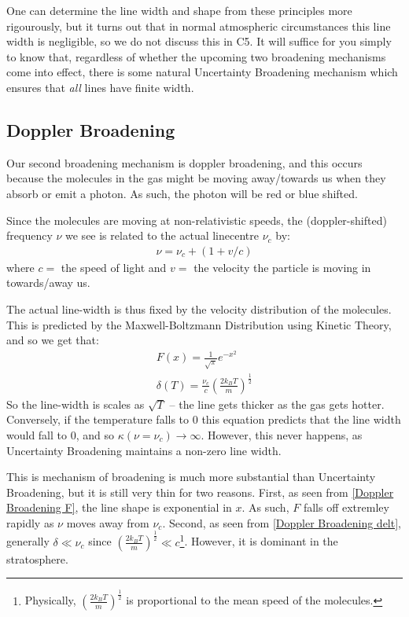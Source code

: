 One can determine the line width and shape from these principles more rigourously, but it turns out that in normal atmospheric circumstances this line width is negligible, so we do not discuss this in C5. It will suffice for you simply to know that, regardless of whether the upcoming two broadening mechanisms come into effect, there is some natural Uncertainty Broadening mechanism which ensures that \textit{all} lines have finite width.

\subsection{Doppler Broadening}

Our second broadening mechanism is doppler broadening, and this occurs because the molecules in the gas might be moving away/towards us when they absorb or emit a photon. As such, the photon will be red or blue shifted.

Since the molecules are moving at non-relativistic speeds, the (doppler-shifted) frequency $\nu$ we see is related to the actual linecentre $\nu_c$ by:
\begin{align*}
    \nu=\nu_c+(1+v/c)
\end{align*}
where $c=$ the speed of light and $v=$ the velocity the particle is moving in towards/away us.

The actual line-width is thus fixed by the velocity distribution of the molecules. This is predicted by the Maxwell-Boltzmann Distribution using Kinetic Theory, and so we get that:
\begin{gather}
    \label{Doppler Broadening F}
    \boxed{
        F(x)=\frac{1}{\sqrt{\pi}}e^{-x^2}
    }\\
    \label{Doppler Broadening delt}
    \boxed{
        \delta(T) = \frac{\nu_c}{c}\left( \frac{2k_BT}{m} \right)^{\frac{1}{2}}
    }
\end{gather}
So the line-width is scales as $\sqrt{T}$ – the line gets thicker as the gas gets hotter. Conversely, if the temperature falls to $0$ this equation predicts that the line width would fall to $0$, and so $\kappa(\nu=\nu_c)\to\infty$. However, this never happens, as Uncertainty Broadening maintains a non-zero line width.

This is mechanism of broadening is much more substantial than Uncertainty Broadening, but it is still very thin for two reasons. First, as seen from \ref{Doppler Broadening F}, the line shape is exponential in $x$. As such, $F$ falls off extremley rapidly as $\nu$ moves away from $\nu_c$. Second, as seen from \ref{Doppler Broadening delt}, generally $\delta\ll\nu_c$ since $\left( \frac{2k_BT}{m} \right)^{\frac{1}{2}}\ll c$\footnote{Physically, $\left( \frac{2k_BT}{m} \right)^{\frac{1}{2}}$ is proportional to the mean speed of the molecules.}. However, it is dominant in the stratosphere.

